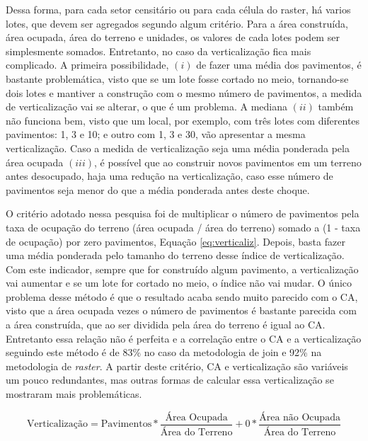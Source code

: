 Dessa forma, para cada setor censitário ou para cada célula do raster, há varios lotes, que devem ser agregados segundo algum critério. Para a área construída, área ocupada, área do terreno e unidades, os valores de cada lotes podem ser simplesmente somados. Entretanto, no caso da verticalização fica mais complicado. A primeira possibilidade, $(i)$ de fazer uma média dos pavimentos, é bastante problemática, visto que se um lote fosse cortado no meio, tornando-se dois lotes e mantiver a construção com o mesmo número de pavimentos, a medida de verticalização vai se alterar, o que é um problema. A mediana $(ii)$ também não funciona bem, visto que um local, por exemplo, com três lotes com diferentes pavimentos: 1, 3 e 10; e outro com 1, 3 e 30, vão apresentar a mesma verticalização. Caso a medida de verticalização seja uma média ponderada pela área ocupada $(iii)$, é possível que ao construir novos pavimentos em um terreno antes desocupado, haja uma redução na verticalização, caso esse número de pavimentos seja menor do que a média ponderada antes deste choque. 

O critério adotado nessa pesquisa foi de multiplicar o número de pavimentos pela taxa de ocupação do terreno (área ocupada / área do terreno) somado a (1 - taxa de ocupação) por zero pavimentos, Equação \ref{eq:verticaliz}. Depois, basta fazer uma média ponderada pelo tamanho do terreno desse índice de verticalização. Com este indicador, sempre que for construído algum pavimento, a verticalização vai aumentar e se um lote for cortado no meio, o índice não vai mudar. O único problema desse método é que o resultado acaba sendo muito parecido com o CA, visto que a área ocupada vezes o número de pavimentos é bastante parecida com a área construída, que ao ser dividida pela área do terreno é igual ao CA. Entretanto essa relação não é perfeita e a correlação entre o CA e a verticalização seguindo este método é de 83\% no caso da metodologia de join e 92\% na metodologia de \textit{raster}. A partir deste critério, CA e verticalização são variáveis um pouco redundantes, mas outras formas de calcular essa verticalização se mostraram mais problemáticas.

\begin{equation}
    \text{Verticalização} = \text{Pavimentos} * \frac{\text{Área Ocupada}}{\text{Área do Terreno}} + 0 * \frac{\text{Área não Ocupada}}{\text{Área do Terreno}}
    \label{eq:verticaliz}
\end{equation}


